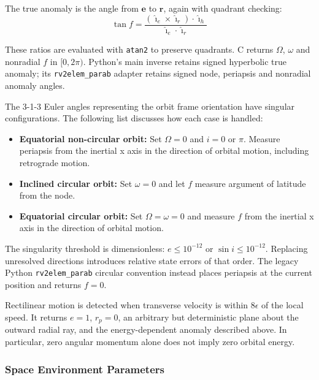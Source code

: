 The true anomaly is the angle from $\bm e$ to $\bm r$, again with quadrant checking:
\begin{equation}
	\tan f = \frac{(\hat{\bm \imath}_{e} \times \hat{\bm \imath}_{r}) \cdot \hat{\bm \imath}_{h}}
	{\hat{\bm \imath}_{e} \cdot \hat{\bm \imath}_{r}}
\end{equation}

These ratios are evaluated with {\tt atan2} to preserve quadrants. C returns $\Omega$, $\omega$ and nonradial $f$ in $[0,2\pi)$. Python's main inverse retains signed hyperbolic true anomaly; its {\tt rv2elem\_parab} adapter retains signed node, periapsis and nonradial anomaly angles.

The 3-1-3 Euler angles representing the orbit frame orientation have singular configurations.  The following list discusses how each case is handled:
\begin{itemize}
	\item {\bfseries Equatorial non-circular orbit:} Set $\Omega=0$ and $i=0$ or $\pi$. Measure periapsis from the inertial x axis in the direction of orbital motion, including retrograde motion.
	\item {\bfseries Inclined circular orbit:} Set $\omega=0$ and let $f$ measure argument of latitude from the node.
	\item {\bfseries Equatorial circular orbit:} Set $\Omega=\omega=0$ and measure $f$ from the inertial x axis in the direction of orbital motion.
\end{itemize}
The singularity threshold is dimensionless: $e\leq10^{-12}$ or $\sin i\leq10^{-12}$. Replacing unresolved directions introduces relative state errors of that order. The legacy Python {\tt rv2elem\_parab} circular convention instead places periapsis at the current position and returns $f=0$.

Rectilinear motion is detected when transverse velocity is within $8\epsilon$ of the local speed. It returns $e=1$, $r_p=0$, an arbitrary but deterministic plane about the outward radial ray, and the energy-dependent anomaly described above. In particular, zero angular momentum alone does not imply zero orbital energy.















\subsubsection{Space Environment Parameters}
